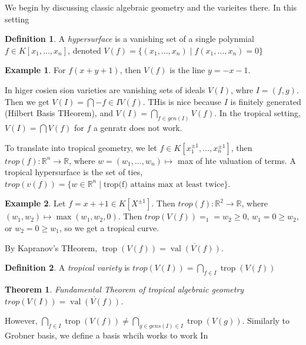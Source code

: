\documentclass[12pt]{memoir}
\DeclareMathOperator{\val}{val}
\newtheorem{prototheorem}{Theorem}[section]
\newenvironment{theorem}
   {\begin{prototheorem}}
   {\end{prototheorem}}
\theoremstyle{definition}
\newtheorem{protoexample}{Example}[section]
\newenvironment{ex}
   {\begin{protoexample}}
   {\end{protoexample}}
\newtheorem{protodefinition}{Definition}[section]
\newenvironment{define}
   {\begin{protodefinition}}
   {\end{protodefinition}}
\def\RR{{\mathbb R}}
\DeclareMathOperator{\trop}{trop}
\begin{document}


We begin by discussing classic algebraic geometry and the varieites there. In this setting

\begin{define}
A \emph{hypersurface} is a vanishing set of a single polynmial $f \in K[x_1, \dots, x_n]$, denoted $V(f) = \{(x_1, \dots, x_n) \; |\; f(x_1, \dots, x_n)=0\}$
\end{define}

\begin{ex}
    For $f(x+y+1)$, then $V(f)$ is the line $y=-x-1$.
\end{ex}



In higer cosien sion varieties are vanishing sets of ideals $V(I)$, whre $I=(f,g)$. Then we get $V(I)= \bigcap\limits-{f \in I} V(f)$. THis is nice because $I$ is finitely generated (Hilbert Basis THeorem), and $V(I) = \bigcap\limits_{f \in gen(I)} V(f)$. In the tropical setting, $V(I) = \bigcap V(f)$ for $f$ a genratr does not work.


To translate into tropical geometry, we let $f \in K[x_1^{\pm1}, \dots, x_n^{\pm1}]$, then$ trop(f):\RR^n \rightarrow \RR$, where $w=(w_1, \dots, w_n) \mapsto$ max of hte valuation of terms. A tropical hypersurface is the set of ties, $trop(v(f)) = \{w \in \RR^n \; |\; \text{trop(f) attains max at least twice}\}$.




\begin{ex}
Let $f=x++1 \in K[X^{\pm1}]$. Then $trop(f) :\RR^2\rightarrow \RR$, where $(w_1,w_2) \mapsto \max(w_1,w_2, 0)$. Then $trop(V(f))= _1=w_2\geq 0$, $w_1=0\geq w_2$, or $w_2 = 0 \geq w_1$, so we get a tropical curve. 
\end{ex}

By Kapranov's THeorem, $\trop(V(f)) = \overline{\val(V(f))}$.

\begin{define}
A \emph{tropical variety} is $trop(V(I))= \bigcap\limits_{f \in I} \trop(V(f))$
\end{define}


\begin{theorem}{Fundamental Theorem of tropical algebraic geometry}
    $trop(V(I))= \overline{\val(V(f))}$.
\end{theorem}

However, $\bigcap\limits_{f \in I} \trop(V(f)) \neq \bigcap\limits_{g \in gens(I) \in I} \trop(V(g))$. Similarly to Grobner basis, we define a basis whcih works to work In
\end{document}
